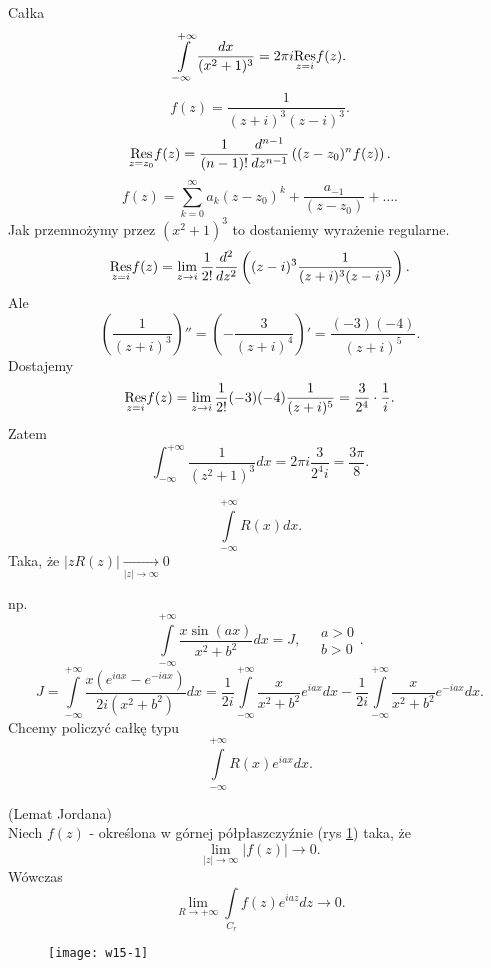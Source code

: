 \documentclass[../main.tex]{subfiles}
\begin{document}
\begin{przyklad}
    Całka
    \[
        \int\limits_{-\infty}^{+\infty} \frac{dx}{(x^{2}+1)^{3}} = 2 \pi i \underset{z = i}{\operatorname{Res}}f(z)
    .\]
\[
    f(z) = \frac{1}{(z+i)^3(z-i)^3}
.\]
\[
    \underset{z = z_0}{\operatorname{Res}} f(z) = \frac{1}{(n-1)!} \frac{d^{n-1}}{dz^{n-1}}\left( (z - z_0)^n f(z) \right)
.\]
\[
    f(z) = \sum_{k = 0}^{\infty} a_k(z-z_0)^k + \frac{a_{-1}}{(z-z_0)} + \ldots
.\]
Jak przemnożymy przez $(x^2 + 1)^3$ to dostaniemy wyrażenie regularne.
\[
    \underset{z = i}{\operatorname{Res}} f(z) = \lim\limits_{z \to i} \frac{1}{2!} \frac{d^2}{dz^2}\left( (z-i)^3 \frac{1}{(z+i)^3(z-i)^3} \right)
.\]
Ale
\[
    \left( \frac{1}{(z+i)^3} \right)'' = \left( -\frac{3}{(z+i)^4} \right)' = \frac{(-3)(-4)}{(z+i)^5}
.\]
Dostajemy
\[
    \underset{z = i}{\operatorname{Res}} f(z) = \lim\limits_{z\to i} \frac{1}{2!} (-3)(-4) \frac{1}{(z+i)^5} = \frac{3}{2^4} \cdot \frac{1}{i}
.\]
Zatem
\[
    \int_{-\infty}^{+\infty} \frac{1}{(z^2 + 1)^3}dx = 2\pi i \frac{3}{2^4 i} = \frac{3\pi}{8}
.\]
\end{przyklad}
\begin{przyklad}
    \[
        \int\limits_{-\infty}^{+\infty}R(x) dx
    .\]
Taka, że $\left| z R(z)\right| \underset{|z|\to \infty}{\longrightarrow} 0 $

np.
\[
    \int\limits_{-\infty}^{+\infty} \frac{x \sin(ax)}{x^2 + b^2}dx = J,\quad \begin{matrix}a > 0\\ b > 0\end{matrix}
.\]
\[
    J = \int\limits_{-\infty}^{+\infty}\frac{x\left( e^{iax} - e^{-iax} \right) }{2i (x^2 + b^2)}dx = \frac{1}{2i}\int\limits_{-\infty}^{+\infty} \frac{x}{x^2 + b^2}e^{iax}dx - \frac{1}{2i}\int\limits_{-\infty}^{+\infty} \frac{x}{x^2 + b^2}e^{-iax}dx
.\]
Chcemy policzyć całkę typu
\[
    \int\limits_{-\infty}^{+\infty}R(x)e^{iax}dx
.\]
\end{przyklad}
\begin{tw}
    (Lemat Jordana)\\
    Niech $f(z)$ - określona w górnej półpłaszczyźnie (rys \ref{fig:w15-1}) taka, że
    \[
        \lim\limits_{|z|\to \infty}|f(z)| \to 0
    .\]
Wówczas
\[
    \lim\limits_{R\to +\infty} \int\limits_{C_r} f(z)e^{iaz}dz\to 0
.\]
\end{tw}
\begin{figure}[h]
    \centering
    \texttt{[image: w15-1]}
    \label{fig:w15-1}
\end{figure}
\end{document}
